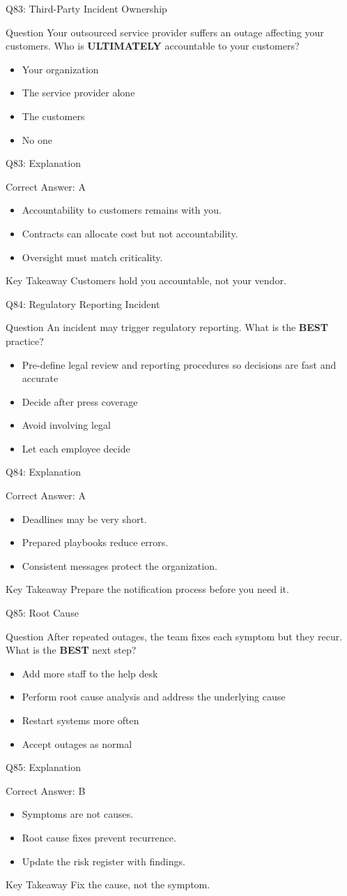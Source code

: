 \documentclass[aspectratio=169]{beamer}
\newcommand{\hq}[7]{%
	\begin{frame}{Q#1: #2}
		\begin{block}{Question}
			#3
		\end{block}
		\begin{itemize}
			#4
		\end{itemize}
	\end{frame}
	\begin{frame}{Q#1: Explanation}
		\begin{block}{Correct Answer: #5}
			\begin{itemize}
				#6
			\end{itemize}
		\end{block}
		\begin{alertblock}{Key Takeaway}
			#7
		\end{alertblock}
	\end{frame}
}
\begin{document}
	\hq{83}{Third-Party Incident Ownership}
	{Your outsourced service provider suffers an outage affecting your customers. Who is \textbf{ULTIMATELY} accountable to your customers?}
	{\item[\textbf{(A)}] Your organization
		\item[\textbf{(B)}] The service provider alone
		\item[\textbf{(C)}] The customers
		\item[\textbf{(D)}] No one}
	{A}
	{\item Accountability to customers remains with you.
		\item Contracts can allocate cost but not accountability.
		\item Oversight must match criticality.}
	{Customers hold you accountable, not your vendor.}
	
	\hq{84}{Regulatory Reporting Incident}
	{An incident may trigger regulatory reporting. What is the \textbf{BEST} practice?}
	{\item[\textbf{(A)}] Pre-define legal review and reporting procedures so decisions are fast and accurate
		\item[\textbf{(B)}] Decide after press coverage
		\item[\textbf{(C)}] Avoid involving legal
		\item[\textbf{(D)}] Let each employee decide}
	{A}
	{\item Deadlines may be very short.
		\item Prepared playbooks reduce errors.
		\item Consistent messages protect the organization.}
	{Prepare the notification process before you need it.}
	
	\hq{85}{Root Cause}
	{After repeated outages, the team fixes each symptom but they recur. What is the \textbf{BEST} next step?}
	{\item[\textbf{(A)}] Add more staff to the help desk
		\item[\textbf{(B)}] Perform root cause analysis and address the underlying cause
		\item[\textbf{(C)}] Restart systems more often
		\item[\textbf{(D)}] Accept outages as normal}
	{B}
	{\item Symptoms are not causes.
		\item Root cause fixes prevent recurrence.
		\item Update the risk register with findings.}
	{Fix the cause, not the symptom.}
	
\end{document}
